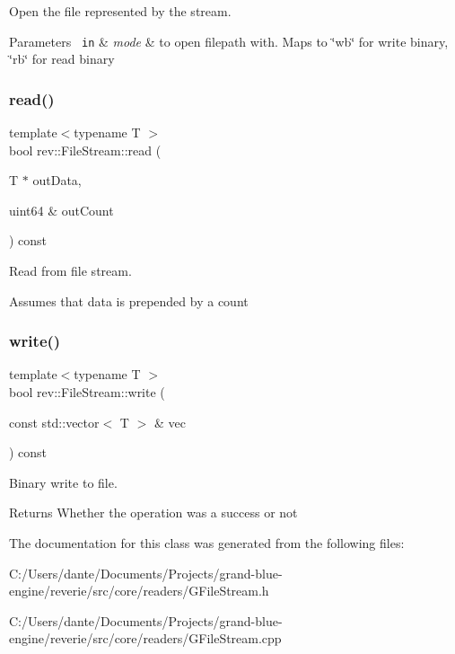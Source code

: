 Open the file represented by the stream. 


\begin{DoxyParams}[1]{Parameters}
\mbox{\texttt{ in}}  & {\em mode} & to open filepath with. Maps to \char`\"{}wb\char`\"{} for write binary, \char`\"{}rb\char`\"{} for read binary \\
\hline
\end{DoxyParams}
\mbox{\label{classrev_1_1_file_stream_a3de51c1f2aebcb45600b5bd9eb5e48ed}} 
\subsubsection{\texorpdfstring{read()}{read()}}
{\footnotesize\ttfamily template$<$typename T $>$ \\
bool rev\+::\+File\+Stream\+::read (\begin{DoxyParamCaption}\item[{T $\ast$}]{out\+Data,  }\item[{uint64 \&}]{out\+Count }\end{DoxyParamCaption}) const\hspace{0.3cm}{\ttfamily [inline]}}



Read from file stream. 

Assumes that data is prepended by a count \mbox{\label{classrev_1_1_file_stream_a288b87bc6513a66186f7e1d66ad01e40}} 
\subsubsection{\texorpdfstring{write()}{write()}}
{\footnotesize\ttfamily template$<$typename T $>$ \\
bool rev\+::\+File\+Stream\+::write (\begin{DoxyParamCaption}\item[{const std\+::vector$<$ T $>$ \&}]{vec }\end{DoxyParamCaption}) const\hspace{0.3cm}{\ttfamily [inline]}}



Binary write to file. 

\begin{DoxyReturn}{Returns}
Whether the operation was a success or not 
\end{DoxyReturn}


The documentation for this class was generated from the following files\+:\begin{DoxyCompactItemize}
\item 
C\+:/\+Users/dante/\+Documents/\+Projects/grand-\/blue-\/engine/reverie/src/core/readers/G\+File\+Stream.\+h\item 
C\+:/\+Users/dante/\+Documents/\+Projects/grand-\/blue-\/engine/reverie/src/core/readers/G\+File\+Stream.\+cpp\end{DoxyCompactItemize}
